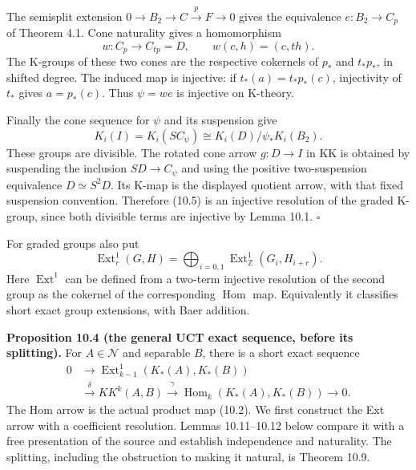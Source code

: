 \documentclass[
  11pt,
]{article}
\begin{document}
The semisplit extension \(0\to B_2\to C\xrightarrow{p}F\to0\) gives the
equivalence \(e:B_2\to C_p\) of Theorem 4.1. Cone naturality gives a
homomorphism \[
w:C_p\longrightarrow C_{tp}=D,\qquad
w(c,h)=(c,t h).
\tag{10.9}
\] The K-groups of these two cones are the respective cokernels of
\(p_*\) and \(t_*p_*\), in shifted degree. The induced map is injective:
if \(t_*(a)=t_*p_*(c)\), injectivity of \(t_*\) gives \(a=p_*(c)\). Thus
\(\psi=we\) is injective on K-theory.

Finally the cone sequence for \(\psi\) and its suspension give \[
K_i(I)=K_i(SC_\psi)
\cong K_i(D)/\psi_*K_i(B_2).
\tag{10.10}
\] These groups are divisible. The rotated cone arrow \(g:D\to I\) in KK
is obtained by suspending the inclusion \(SD\to C_\psi\) and using the
positive two-suspension equivalence \(D\simeq S^2D\). Its K-map is the
displayed quotient arrow, with that fixed suspension convention.
Therefore (10.5) is an injective resolution of the graded K-group, since
both divisible terms are injective by Lemma 10.1. \(\square\)

For graded groups also put \[
\operatorname{Ext}^1_r(G,H)
=\bigoplus_{i=0,1}\operatorname{Ext}^1_{\mathbb Z}(G_i,H_{i+r}).
\tag{10.11}
\] Here \(\operatorname{Ext}^1\) can be defined from a two-term
injective resolution of the second group as the cokernel of the
corresponding \(\operatorname{Hom}\) map. Equivalently it classifies
short exact group extensions, with Baer addition.

\textbf{Proposition 10.4 (the general UCT exact sequence, before its
splitting).} For \(A\in\mathcal N\) and separable \(B\), there is a
short exact sequence \[
\begin{aligned}
0&\longrightarrow
\operatorname{Ext}^1_{k-1}(K_*(A),K_*(B))\\
&\xrightarrow{\delta}KK^k(A,B)
\xrightarrow{\gamma}\operatorname{Hom}_k(K_*(A),K_*(B))
\longrightarrow0 .
\end{aligned}
\tag{10.12}
\] The Hom arrow is the actual product map (10.2). We first construct
the Ext arrow with a coefficient resolution. Lemmas 10.11--10.12 below
compare it with a free presentation of the source and establish
independence and naturality. The splitting, including the obstruction to
making it natural, is Theorem 10.9.
\end{document}
